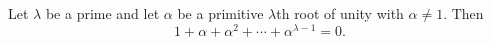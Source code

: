 Let $\lambda$ be a prime and let $\alpha$ be a primitive $\lambda$th root of unity with $\alpha \neq 1$. Then
$$1 + \alpha + \alpha^2 + \cdots + \alpha^{\lambda-1} = 0.$$
